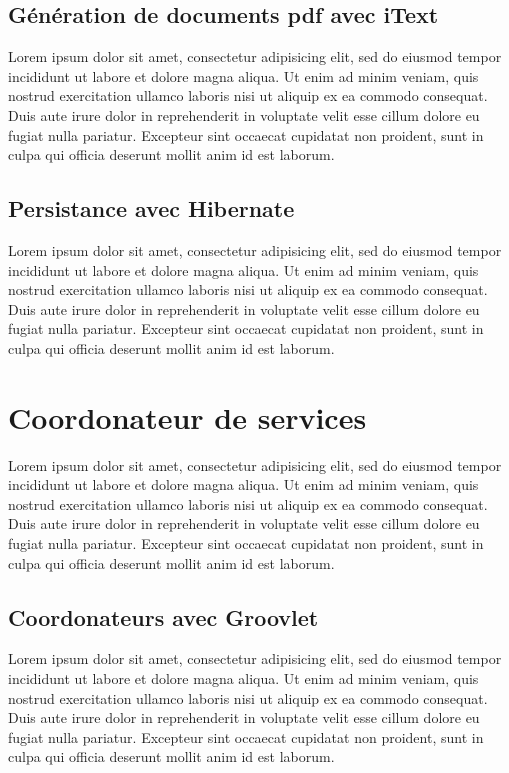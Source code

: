 \documentclass{article}
\begin{document}
\subsection{Génération de documents pdf avec iText} %
\label{sub:generation_de_documents_pdf_avec_itext}
Lorem ipsum dolor sit amet, consectetur adipisicing elit, sed do eiusmod tempor incididunt ut labore et dolore magna aliqua. Ut enim ad minim veniam, quis nostrud exercitation ullamco laboris nisi ut aliquip ex ea commodo consequat. Duis aute irure dolor in reprehenderit in voluptate velit esse cillum dolore eu fugiat nulla pariatur. Excepteur sint occaecat cupidatat non proident, sunt in culpa qui officia deserunt mollit anim id est laborum.

\subsection{Persistance avec Hibernate} %
\label{sub:persistance_avec_hibernate}
Lorem ipsum dolor sit amet, consectetur adipisicing elit, sed do eiusmod tempor incididunt ut labore et dolore magna aliqua. Ut enim ad minim veniam, quis nostrud exercitation ullamco laboris nisi ut aliquip ex ea commodo consequat. Duis aute irure dolor in reprehenderit in voluptate velit esse cillum dolore eu fugiat nulla pariatur. Excepteur sint occaecat cupidatat non proident, sunt in culpa qui officia deserunt mollit anim id est laborum.


\section{Coordonateur de services} %
\label{sec:coordonateur_de_services}
Lorem ipsum dolor sit amet, consectetur adipisicing elit, sed do eiusmod tempor incididunt ut labore et dolore magna aliqua. Ut enim ad minim veniam, quis nostrud exercitation ullamco laboris nisi ut aliquip ex ea commodo consequat. Duis aute irure dolor in reprehenderit in voluptate velit esse cillum dolore eu fugiat nulla pariatur. Excepteur sint occaecat cupidatat non proident, sunt in culpa qui officia deserunt mollit anim id est laborum.

\subsection{Coordonateurs avec Groovlet} %
\label{sub:coordonateurs_avec_groovlet}
Lorem ipsum dolor sit amet, consectetur adipisicing elit, sed do eiusmod tempor incididunt ut labore et dolore magna aliqua. Ut enim ad minim veniam, quis nostrud exercitation ullamco laboris nisi ut aliquip ex ea commodo consequat. Duis aute irure dolor in reprehenderit in voluptate velit esse cillum dolore eu fugiat nulla pariatur. Excepteur sint occaecat cupidatat non proident, sunt in culpa qui officia deserunt mollit anim id est laborum.
\end{document}
